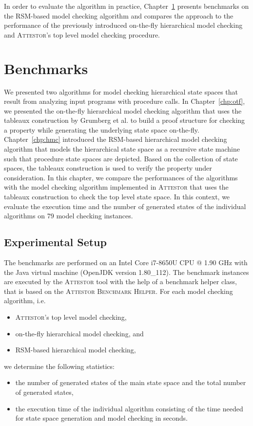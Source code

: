 \documentclass[a4paper, 12pt, twoside]{report}
\begin{document}
	In order to evaluate the algorithm in practice, Chapter~\ref{chp:benchmarks} presents benchmarks on the RSM-based model checking algorithm and compares the approach to the performance of the previously introduced on-the-fly hierarchical model checking and \textsc{Attestor}'s top level model checking procedure.
	
	\chapter{Benchmarks}\label{chp:benchmarks}	
	
	We presented two algorithms for model checking hierarchical state spaces that result from analyzing input programs with procedure calls. In Chapter~\ref{chp:otf}, we presented the on-the-fly hierarchical model checking algorithm that uses the tableaux construction by Grumberg et al. \cite{bhat1995efficient} to build a proof structure for checking a property while generating the underlying state space on-the-fly. Chapter~\ref{chp:hmc} introduced the RSM-based hierarchical model checking algorithm that models the hierarchical state space as a recursive state machine such that procedure state spaces are depicted. Based on the collection of state spaces, the tableaux construction is used to verify the property under consideration. In this chapter, we compare the performances of the algorithms with the model checking algorithm implemented in \textsc{Attestor} that uses the tableaux construction to check the top level state space. In this context, we evaluate the execution time and the number of generated states of the individual algorithms on 79 model checking instances. 
	
	\section{Experimental Setup}
	
	The benchmarks are performed on an Intel Core i7-8650U CPU @ 1.90 GHz with the Java virtual machine (OpenJDK version 1.80\_112). The benchmark instances are executed by the \textsc{Attestor} tool with the help of a benchmark helper class, that is based on the \textsc{Attestor Benchmark Helper}. For each model checking algorithm, i.e.
	\begin{itemize}
		\item \textsc{Attestor}'s top level model checking,
		\item on-the-fly hierarchical model checking, and
		\item RSM-based hierarchical model checking,
	\end{itemize}
	we determine the following statistics:
	\begin{itemize}
		\item the number of generated states of the main state space and the total number of generated states,
		\item the execution time of the individual algorithm consisting of the time needed for state space generation and model checking in seconds. 
	\end{itemize}  
\end{document}
